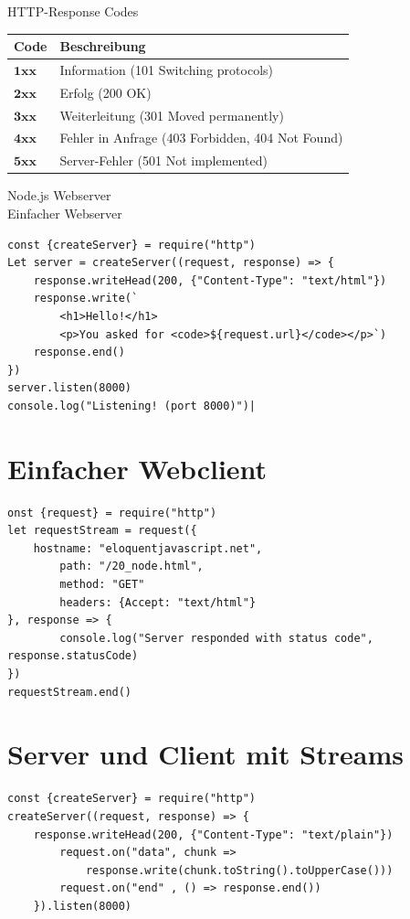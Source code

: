 \documentclass[10pt]{article}
\begin{document}
HTTP-Response Codes

\begin{center}
\begin{tabular}{|l|l|}
\hline
Code & Beschreibung \\
\hline
$\mathbf{1 x x}$ & Information (101 Switching protocols) \\
\hline
$\mathbf{2 x x}$ & Erfolg (200 OK) \\
\hline
$\mathbf{3 x x}$ & Weiterleitung (301 Moved permanently) \\
\hline
$\mathbf{4 x x}$ & Fehler in Anfrage (403 Forbidden, 404 Not Found) \\
\hline
$\mathbf{5 x x}$ & Server-Fehler (501 Not implemented) \\
\hline
\end{tabular}
\end{center}

Node.js Webserver\\
Einfacher Webserver

\begin{verbatim}
const {createServer} = require("http")
Let server = createServer((request, response) => {
    response.writeHead(200, {"Content-Type": "text/html"})
    response.write(`
        <h1>Hello!</h1>
        <p>You asked for <code>${request.url}</code></p>`)
    response.end()
})
server.listen(8000)
console.log("Listening! (port 8000)")|
\end{verbatim}

\section*{Einfacher Webclient}
\begin{verbatim}
onst {request} = require("http")
let requestStream = request({
    hostname: "eloquentjavascript.net",
        path: "/20_node.html",
        method: "GET"
        headers: {Accept: "text/html"}
}, response => {
        console.log("Server responded with status code", response.statusCode)
})
requestStream.end()
\end{verbatim}

\section*{Server und Client mit Streams}
\begin{verbatim}
const {createServer} = require("http")
createServer((request, response) => {
    response.writeHead(200, {"Content-Type": "text/plain"})
        request.on("data", chunk =>
            response.write(chunk.toString().toUpperCase()))
        request.on("end" , () => response.end())
    }).listen(8000)
\end{verbatim}
\end{document}
